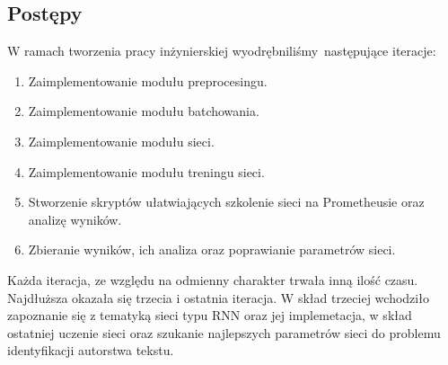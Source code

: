 \subsection{Postępy}
W ramach tworzenia pracy inżynierskiej wyodrębniliśmy następujące iteracje:
\begin{enumerate}
  \item Zaimplementowanie modułu preprocesingu.
  \item Zaimplementowanie modułu batchowania.
  \item Zaimplementowanie modułu sieci.
  \item Zaimplementowanie modułu treningu sieci.
  \item Stworzenie skryptów ułatwiających szkolenie sieci na Prometheusie oraz analizę wyników.
  \item Zbieranie wyników, ich analiza oraz poprawianie parametrów sieci.
\end{enumerate}  

  Każda iteracja, ze względu na odmienny charakter trwała inną ilość czasu. Najdłuższa okazała się
trzecia i ostatnia iteracja. W skład trzeciej wchodziło zapoznanie się z tematyką sieci typu RNN oraz
jej implemetacja, w skład ostatniej uczenie sieci oraz szukanie najlepszych parametrów sieci do problemu 
identyfikacji autorstwa tekstu.

